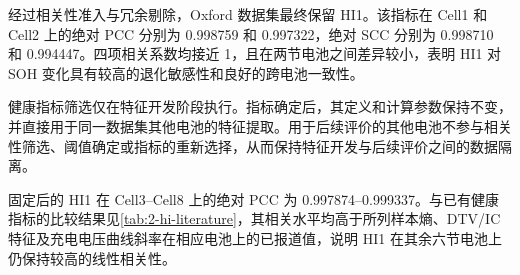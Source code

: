 经过相关性准入与冗余剔除，Oxford 数据集最终保留 HI1。该指标在 Cell1 和 Cell2 上的绝对 PCC 分别为 0.998759 和 0.997322，绝对 SCC 分别为 0.998710 和 0.994447。四项相关系数均接近 1，且在两节电池之间差异较小，表明 HI1 对 SOH 变化具有较高的退化敏感性和良好的跨电池一致性。

健康指标筛选仅在特征开发阶段执行。指标确定后，其定义和计算参数保持不变，并直接用于同一数据集其他电池的特征提取。用于后续评价的其他电池不参与相关性筛选、阈值确定或指标的重新选择，从而保持特征开发与后续评价之间的数据隔离。

固定后的 HI1 在 Cell3--Cell8 上的绝对 PCC 为 0.997874--0.999337。与已有健康指标的比较结果见\cref{tab:2-hi-literature}，其相关水平均高于所列样本熵、DTV/IC 特征及充电电压曲线斜率在相应电池上的已报道值，说明 HI1 在其余六节电池上仍保持较高的线性相关性。



